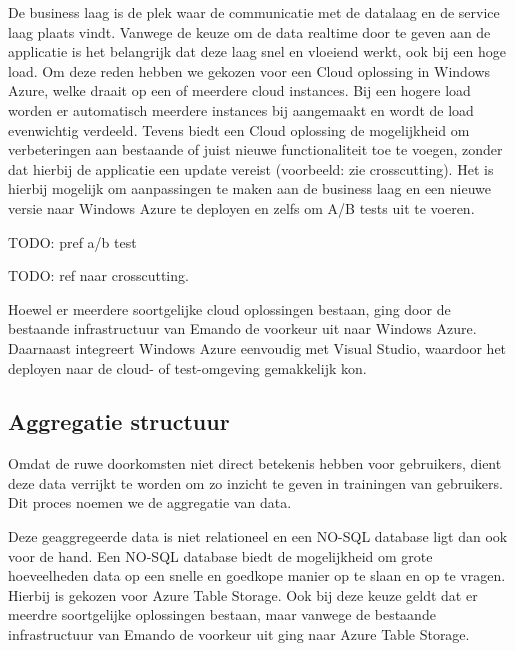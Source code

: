 De business laag is de plek waar de communicatie met de datalaag en de service laag plaats vindt. Vanwege de keuze om de data realtime door te geven aan de applicatie is het belangrijk dat deze laag snel en vloeiend werkt, ook bij een hoge load. Om deze reden hebben we gekozen voor een Cloud oplossing in Windows Azure, welke draait op een of meerdere cloud instances. Bij een hogere load worden er automatisch meerdere instances bij aangemaakt en wordt de load evenwichtig verdeeld. Tevens biedt een Cloud oplossing de mogelijkheid om verbeteringen aan bestaande of juist nieuwe functionaliteit toe te voegen, zonder dat hierbij de applicatie een update vereist (voorbeeld: zie crosscutting). Het is hierbij mogelijk om aanpassingen te maken aan de business laag en een nieuwe versie naar Windows Azure te deployen en zelfs om A/B tests uit te voeren. {\par \bigskip \par \color{red} TODO: pref a/b test \par \bigskip \par }

{\par \bigskip \par \color{red} TODO: ref naar crosscutting. \par \bigskip \par }


Hoewel er meerdere soortgelijke cloud oplossingen bestaan, ging door de bestaande infrastructuur van Emando de voorkeur uit naar Windows Azure. Daarnaast integreert Windows Azure eenvoudig met Visual Studio, waardoor het deployen naar de cloud- of test-omgeving gemakkelijk kon.

\subsection{Aggregatie structuur}
Omdat de ruwe doorkomsten niet direct betekenis hebben voor gebruikers, dient deze data verrijkt te worden om zo inzicht te geven in trainingen van gebruikers. Dit proces noemen we de aggregatie van data.

Deze geaggregeerde data is niet relationeel en een NO-SQL database ligt dan ook voor de hand.  Een NO-SQL database biedt de mogelijkheid om grote hoeveelheden data op een snelle en goedkope manier op te slaan en op te vragen.
Hierbij is gekozen voor Azure Table Storage. Ook bij deze keuze geldt dat er meerdre soortgelijke oplossingen bestaan, maar vanwege de bestaande infrastructuur van Emando de voorkeur uit ging naar Azure Table Storage.

